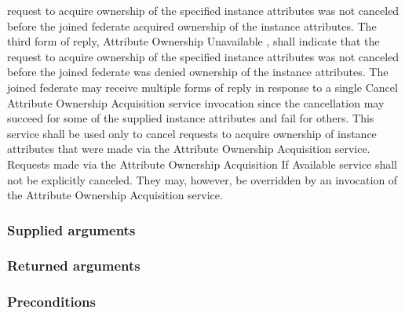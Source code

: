 \begin{compactstdpage}

    request to acquire ownership of the specified instance attributes was not canceled before the joined federate acquired ownership of the instance attributes. The third form of reply, Attribute Ownership Unavailable \rtiinitiated{}, shall indicate that the request to acquire ownership of the specified instance attributes was not canceled before the joined federate was denied ownership of the instance attributes. The joined federate may receive multiple forms of reply in response to a single Cancel Attribute Ownership Acquisition service invocation since the cancellation may succeed for some of the supplied instance attributes and fail for others. This service shall be used only to cancel requests to acquire ownership of instance attributes that were made via the Attribute Ownership Acquisition service. Requests made via the Attribute Ownership Acquisition If Available service shall not be explicitly canceled. They may, however, be overridden by an invocation of the Attribute Ownership Acquisition service.

    \subsubsection{Supplied arguments}



    \subsubsection{Returned arguments}



    \subsubsection{Preconditions}




\end{compactstdpage}
